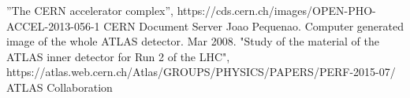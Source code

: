 \begin{thebibliography}{24}
”The CERN accelerator complex”, https://cds.cern.ch/images/OPEN-PHO-ACCEL-2013-056-1 CERN Document Server
Joao Pequenao. Computer generated image of the whole ATLAS detector. Mar 2008.
"Study of the material of the ATLAS inner detector for Run 2 of the LHC", https://atlas.web.cern.ch/Atlas/GROUPS/PHYSICS/PAPERS/PERF-2015-07/ ATLAS Collaboration
\end{thebibliography}
